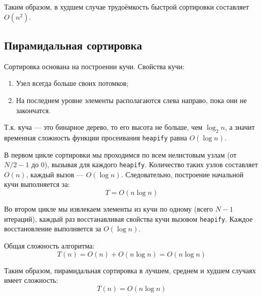 \documentclass[otchet]{SCWorks}
\begin{document}
Таким образом, в худшем случае трудоёмкость быстрой сортировки составляет $O(n^2)$.

\subsection{Пирамидальная сортировка}

Сортировка основана на построении кучи. Свойства кучи:
\begin{enumerate}
    \item Узел всегда больше своих потомков;
    \item На последнем уровне элементы располагаются слева направо, пока они не закончатся.
\end{enumerate}

Т.к. куча — это бинарное дерево, то его высота не больше, чем $\log_2 n$, а значит временная сложность функции просеивания \texttt{heapify} равна $O(\log n)$.

В первом цикле сортировки мы проходимся по всем нелистовым узлам (от $N/2 - 1$ до $0$), вызывая для каждого \texttt{heapify}. Количество таких узлов составляет $O(n)$, каждый вызов — $O(\log n)$. Следовательно, построение начальной кучи выполняется за:
\[
T = O(n \log n)
\]

Во втором цикле мы извлекаем элементы из кучи по одному (всего $N-1$ итераций), каждый раз восстанавливая свойства кучи вызовом \texttt{heapify}. Каждое восстановление выполняется за $O(\log n)$.

Общая сложность алгоритма:
\[
T(n) = O(n) + O(n \log n) = O(n \log n)
\]

Таким образом, пирамидальная сортировка в лучшем, среднем и худшем случаях имеет сложность:
\[
T(n) = O(n \log n)
\]
\end{document}
